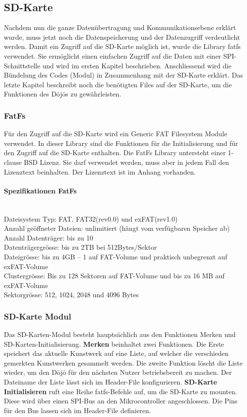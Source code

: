\subsection{SD-Karte}\label{sec:sdKarte}

Nachdem nun die ganze Datenübertragung und Kommunikationsebene erklärt wurde, muss jetzt noch die Datenspeicherung und der Datenzugriff verdeutlicht werden. Damit ein Zugriff auf die SD-Karte möglich ist, wurde die Library fatfs verwendet. Sie ermöglicht einen einfachen Zugriff auf die Daten mit einer SPI-Schnittstelle und wird im ersten Kapitel beschrieben. Anschliessend wird die Bündelung des Codes (Modul) in Zusammenhang mit der SD-Karte erklärt. Das letzte Kapitel beschreibt noch die benötigten Files auf der SD-Karte, um die Funktionen des Dōjōs zu gewährleisten.

\subsubsection{FatFs}

Für den Zugriff auf die SD-Karte wird ein Generic FAT Filesystem Module verwendet. In dieser Library sind die Funktionen für die Initialisierung und für den Zugriff auf die SD-Karte enthalten. Die FatFs Library untersteht einer 1-clause BSD Lizenz. Sie darf verwendet werden, muss aber in jedem Fall den Lizenztext beinhalten. Der Lizenztext ist im Anhang vorhanden.

\paragraph{Spezifikationen FatFs}$~~$\\
Dateisystem Typ: FAT, FAT32(rev0.0) und exFAT(rev1.0)\\
Anzahl geöffneter Dateien: unlimitiert (hängt vom verfügbaren Speicher ab)\\
Anzahl Datenträger: bis zu 10\\
Datenträgergrösse: bis zu 2TB bei 512Bytes/Sektor\\
Dateigrösse: bis zu 4GB – 1 auf FAT-Volume und praktisch unbegrenzt auf exFAT-Volume\\
Clustergrösse: Bis zu 128 Sektoren auf FAT-Volume und bis zu 16 MB auf exFAT-Volume	\\
Sektorgrösse:  512, 1024, 2048 und 4096 Bytes \cite{FatFs}\\ 

\subsubsection{SD-Karte Modul}
Das SD-Karten-Modul besteht hauptsächlich aus den Funktionen Merken und SD-Karten-Initialisierung. \textbf{Merken} beinhaltet zwei Funktionen. Die Erste speichert das aktuelle Kunstwerk auf eine Liste, auf welcher die verschieden gemerkten Kunstwerken gesammelt werden. Die zweite Funktion löscht die Liste wieder, um den Dōjō für den nächsten Nutzer betriebsbereit zu machen. Der Dateiname der Liste lässt sich im Header-File konfigurieren. \textbf{SD-Karte Initialisieren} ruft eine Reihe fatfs-Befehle auf, um die SD-Karte zu mounten. Diese wird über einen SPI-Bus an den Mikrocontroller angeschlossen. Die Pins für den Bus lassen sich im Header-File definieren.

